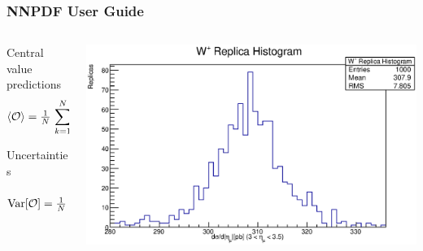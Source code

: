 \documentclass[10pt]{beamer}
\newcommand{\be}{\begin{equation*}}
\newcommand{\ee}{\end{equation*}}
\newcommand{\vso}{\vskip15pt}
\def\smallfrac#1#2{\hbox{${{#1}\over {#2}}$}}
\begin{document}
\begin{frame}
\frametitle{NNPDF User Guide}

\begin{columns}
\begin{column}{0.4\textwidth}
\small
\begin{block} 
{ \small Central value predictions}
		\small \be \langle\mathcal{O}\rangle=\smallfrac{1}{N}\,\sum_{k=1}^{N}\mathcal{O}[f_k]\, .\ee
\end{block}
\vskip5pt
\begin{block}
{\small Uncertainties }
	\small	\be {\mathrm{Var}}[\mathcal{O}]=\smallfrac{1}{N}\,\sum_{k=1}^{N}(\mathcal{O}[f_k] -  \langle\mathcal{O}\rangle )^2 .\ee
\end{block}
\end{column}

\begin{column}{0.6\textwidth}
      \includegraphics[width=\textwidth]{figures/WpHist.eps}
\end{column}
\end{columns}

\vso
{}

\end{frame}
\end{document}

